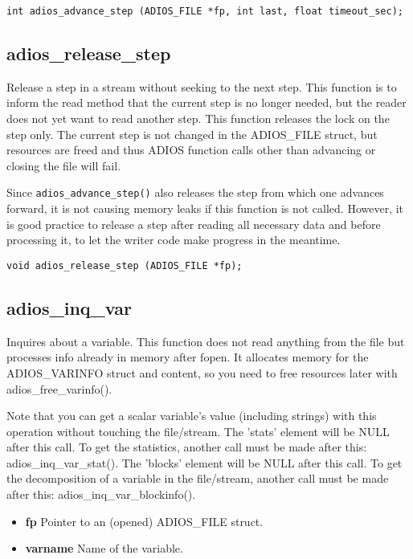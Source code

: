 \begin{lstlisting}[alsolanguage=C]
int adios_advance_step (ADIOS_FILE *fp, int last, float timeout_sec); 
\end{lstlisting}

\subsection{adios\_release\_step}
Release a step in a stream without seeking to the next step.
This function is to inform the read method that the current step is
no longer needed, but the reader does not yet want to read another step.
This function releases the lock on the step only. The current step is not
changed in the ADIOS\_FILE struct, but resources are freed and thus ADIOS function calls other than advancing or closing the file will fail. 

Since \verb+adios_advance_step()+ also releases the step from which one advances 
forward, it is not causing memory leaks if this function is not called. However, it is good practice to release a step after reading all necessary data and before processing it, to let the writer code make progress in the meantime.

\begin{lstlisting}[alsolanguage=C]
void adios_release_step (ADIOS_FILE *fp);
\end{lstlisting}

\subsection{adios\_inq\_var}
\label{section:read_api_adios_inq_var}
Inquires about a variable.
This function does not read anything from the file but processes info
already in memory after fopen.
It allocates memory for the ADIOS\_VARINFO struct and content, so
you need to free resources later with adios\_free\_varinfo().

Note that you can get a scalar variable's value (including strings)
with this operation without touching the file/stream.
The 'stats' element will be NULL after this call. To get the statistics, 
another call must be made after this: adios\_inq\_var\_stat().
The 'blocks' element will be NULL after this call. To get the decomposition
of a variable in the file/stream, another call must be made after this: 
adios\_inq\_var\_blockinfo().

\begin{itemize}
 \item{\bf fp} Pointer to an (opened) ADIOS\_FILE struct.
\item{\bf varname}  Name of the variable.
\end{itemize}

